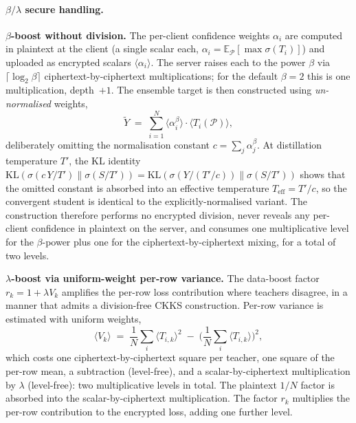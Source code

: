 \paragraph{$\beta/\lambda$ secure handling.}
\label{sec:ensemble_target}
\par\noindent\textbf{$\beta$-boost without division.} The per-client confidence weights $\alpha_i$ are computed in plaintext at the client (a single scalar each, $\alpha_i = \mathbb{E}_{\mathcal{P}}[\max\sigma(T_i)]$) and uploaded as encrypted scalars $\langle\alpha_i\rangle$. The server raises each to the power $\beta$ via $\lceil\log_2\beta\rceil$ ciphertext-by-ciphertext multiplications; for the default $\beta{=}2$ this is one multiplication, depth~$+1$. The ensemble target is then constructed using \emph{un-normalised} weights,
\begin{equation}
    \widetilde Y \;=\; \sum_{i=1}^N \langle\alpha_i^\beta\rangle \cdot \langle T_i(\mathcal P)\rangle,
\end{equation}
deliberately omitting the normalisation constant $c = \sum_j \alpha_j^\beta$. At distillation temperature $T'$, the KL identity $\mathrm{KL}(\sigma(c\,Y/T') \| \sigma(S/T')) = \mathrm{KL}(\sigma(Y/(T'/c)) \| \sigma(S/T'))$ shows that the omitted constant is absorbed into an effective temperature $T_{\text{eff}} = T'/c$, so the convergent student is identical to the explicitly-normalised variant. The construction therefore performs no encrypted division, never reveals any per-client confidence in plaintext on the server, and consumes one multiplicative level for the $\beta$-power plus one for the ciphertext-by-ciphertext mixing, for a total of two levels.

\par\noindent\textbf{$\lambda$-boost via uniform-weight per-row variance.} The data-boost factor $r_k = 1 + \lambda V_k$ amplifies the per-row loss contribution where teachers disagree, in a manner that admits a division-free CKKS construction. Per-row variance is estimated with uniform weights,
\begin{equation}
    \langle V_k\rangle \;=\; \frac{1}{N}\sum_i \langle T_{i,k}\rangle^2 \;-\; \Big(\frac{1}{N}\sum_i \langle T_{i,k}\rangle\Big)^{\!2},
\end{equation}
which costs one ciphertext-by-ciphertext square per teacher, one square of the per-row mean, a subtraction (level-free), and a scalar-by-ciphertext multiplication by $\lambda$ (level-free): two multiplicative levels in total. The plaintext $1/N$ factor is absorbed into the scalar-by-ciphertext multiplication. The factor $r_k$ multiplies the per-row contribution to the encrypted loss, adding one further level.

